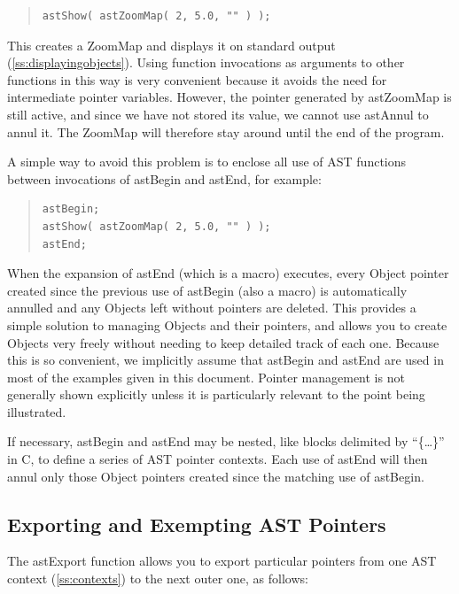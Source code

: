 \documentclass[twoside,11pt]{article}
\newcommand{\htmlref}[2]{#1}
\newcommand{\secref}[1]{\S\ref{#1}}
\renewcommand{\secref}[1]{\ref{#1}}
\begin{document}
\begin{quote}
\small
\begin{verbatim}
astShow( astZoomMap( 2, 5.0, "" ) );
\end{verbatim}
\normalsize
\end{quote}

This creates a \htmlref{ZoomMap}{ZoomMap} and displays it on standard output
(\secref{ss:displayingobjects}). Using function invocations as
arguments to other functions in this way is very convenient because it
avoids the need for intermediate pointer variables. However, the
pointer generated by \htmlref{astZoomMap}{astZoomMap} is still active, and since we have not
stored its value, we cannot use astAnnul to annul it. The ZoomMap will
therefore stay around until the end of the program.

A simple way to avoid this problem is to enclose all use of AST
functions between invocations of \htmlref{astBegin}{astBegin} and \htmlref{astEnd}{astEnd}, for example:

\begin{quote}
\small
\begin{verbatim}
astBegin;
astShow( astZoomMap( 2, 5.0, "" ) );
astEnd;
\end{verbatim}
\normalsize
\end{quote}

When the expansion of astEnd (which is a macro) executes, every \htmlref{Object}{Object}
pointer created since the previous use of astBegin (also a macro) is
automatically annulled and any Objects left without pointers are
deleted. This provides a simple solution to managing Objects and their
pointers, and allows you to create Objects very freely without needing
to keep detailed track of each one.  Because this is so convenient, we
implicitly assume that astBegin and astEnd are used in most of the
examples given in this document.  Pointer management is not generally
shown explicitly unless it is particularly relevant to the point being
illustrated.

If necessary, astBegin and astEnd may be nested, like blocks delimited
by ``\{\ldots\}'' in C, to define a series of AST pointer
contexts. Each use of astEnd will then annul only those Object
pointers created since the matching use of astBegin.

\subsection{Exporting and Exempting AST Pointers}
The \htmlref{astExport}{astExport} function allows you to export particular pointers from
one AST context (\secref{ss:contexts}) to the next outer one, as
follows:
\end{document}
